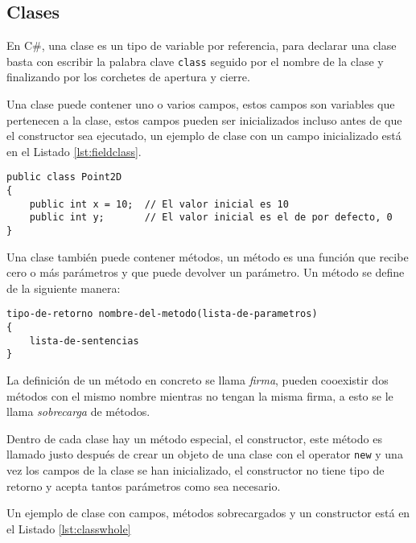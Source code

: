 \documentclass{pre-tfg}
\begin{document}
\subsection{Clases}

En C\#, una clase es un tipo de variable por referencia, para declarar una clase basta con escribir la palabra clave \texttt{class} seguido por el nombre de la clase y finalizando por los corchetes de apertura y cierre.

Una clase puede contener uno o varios campos, estos campos son variables que pertenecen a la clase, estos campos pueden ser inicializados incluso antes de que el constructor sea ejecutado, un ejemplo de clase con un campo inicializado está en el Listado \ref{lst:fieldclass}.

\begin{spacing}{1}
\begin{lstlisting}[float=htbp, caption=Ejemplo de clase con un campo inicializado, label=lst:fieldclass]
public class Point2D 
{ 
	public int x = 10;  // El valor inicial es 10
	public int y;       // El valor inicial es el de por defecto, 0
}
\end{lstlisting}
\end{spacing}

Una clase también puede contener métodos, un método es una función que recibe cero o más parámetros y que puede devolver un parámetro. Un método se define de la siguiente manera:

\begin{spacing}{1}
\begin{lstlisting}[float=htbp, caption=Estructura de un método, label=lst:methoddeclaration]
tipo-de-retorno nombre-del-metodo(lista-de-parametros)
{
	lista-de-sentencias
}
\end{lstlisting}
\end{spacing}

La definición de un método en concreto se llama \emph{firma}, pueden cooexistir dos métodos con el mismo nombre mientras no tengan la misma firma, a esto se le llama \emph{sobrecarga} de métodos.

Dentro de cada clase hay un método especial, el constructor, este método es llamado justo después de crear un objeto de una clase con el operator \texttt{new} y una vez los campos de la clase se han inicializado, el constructor no tiene tipo de retorno y acepta tantos parámetros como sea necesario.

Un ejemplo de clase con campos, métodos sobrecargados y un constructor está en el Listado \ref{lst:classwhole}
\end{document}
